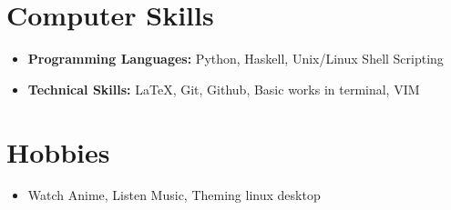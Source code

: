 \documentclass[10pt,a4paper,sans]{moderncv}        %
\begin{document}
	
	\section{Computer Skills}
	
	\begin{itemize}
		
		\item \textbf{Programming Languages:} Python, Haskell, Unix/Linux Shell Scripting
		
		\item \textbf{Technical Skills:} \LaTeX, Git, Github, Basic works in terminal, VIM
		
		
	\end{itemize}
	\section{Hobbies}

	\begin{itemize}
		
		\item  Watch Anime, Listen Music, Theming linux desktop
		
		
	\end{itemize}
%	
	
	
	
\end{document}
